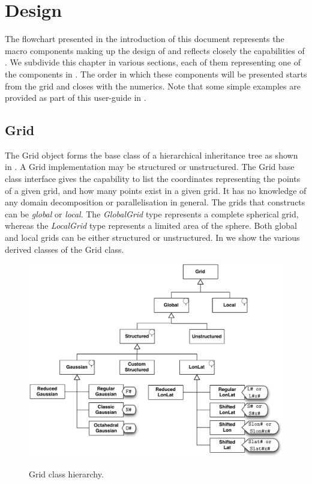 \chapter{Design}
\label{chap:structure}
The flowchart presented in the introduction of this document 
represents the macro components making up the design of \Atlas
and reflects closely the capabilities of \Atlas. We subdivide this 
chapter in various sections, each of them representing one 
of the components in . The order in 
which these components will be presented starts from the grid 
and closes with the numerics. Note that some simple examples 
are provided as part of this user-guide in .


\section{Grid}
%
The Grid object forms the base class of a hierarchical inheritance tree 
as shown in . A Grid implementation may be structured or
unstructured. The Grid base class interface gives the capability to 
list the coordinates representing the points of a given grid, and how many
points exist in a given grid. It has no knowledge of any domain decomposition
or parallelisation in general.
The grids that \Atlas constructs can be \textit{global} or 
\textit{local}. The \textit{GlobalGrid} type represents a complete
spherical grid, whereas the \textit{LocalGrid} type represents a limited 
area of the sphere. Both global and local grids can be either 
structured or unstructured. In  we show the 
various derived classes of the Grid class.
%
\begin{figure}[htb]
\centering
\includegraphics[width=\textwidth]{imgs/grids.pdf}
\label{fig:grids}
\caption{Grid class hierarchy.}
\end{figure}
